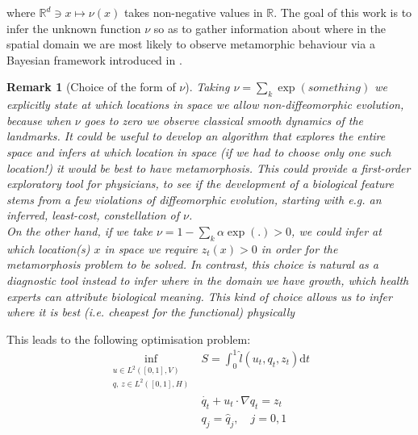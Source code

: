 \documentclass{article}
\newtheorem{remark}{Remark}
\newcommand{\diff}[1]{\text{d} #1}
\newcommand{\Rd}{\mathbb{R}^{d}}
\begin{document}
where $\Rd\ni x\mapsto\nu (x)$ takes non-negative values in $\mathbb R$. The
goal of this work is to infer the unknown function $\nu$ so as to gather
information about where in the spatial domain we are most likely to observe
metamorphic behaviour via a Bayesian framework introduced in
\cite{stuart_something}.

\begin{remark}[Choice of the form of $\nu$]
Taking $\nu = \sum_k \exp(something)$ we explicitly state at which locations in
space we allow non-diffeomorphic evolution, because when $\nu$ goes to zero we
observe classical smooth dynamics of the landmarks. It could be useful to
develop an algorithm that explores the entire space and infers at which location
in space (if we had to choose only one such location!) it would be best to have
metamorphosis. This could provide a first-order exploratory tool for physicians,
to see if the development of a biological feature stems from a few violations of
diffeomorphic evolution, starting with e.g. an inferred, least-cost,
constellation of $\nu$.\\
On the other hand, if we take $\nu =1 - \sum_k \alpha \exp(.)>0$, we could infer
at which location(s) $x$ in space we require $z_t(x)>0$ in order for the
metamorphosis problem to be solved. In contrast, this choice is natural as a
diagnostic tool instead to infer where in the domain we have growth, which
health experts can attribute biological meaning. This kind of choice allows us
to infer where it is best (i.e. cheapest for the functional) \emph{physically}
\end{remark}

This leads to the following optimisation problem:
\begin{subequations}\label{pbl:selective_mm}
\begin{align}
\inf_{\substack{u\in L^2([0,1],V)\\q,\, z \in L^2([0,1],H)}} & S = \int_0^1
\hat l(u_t, q_t, z_t)\diff{t}\label{nu_fnl}\\
    & \dot{q_t} + u_t \cdot \nabla q_t = z_t \\
    & q_j = \hat q_j, \quad j=0,1
\end{align}
\end{subequations}
\end{document}
